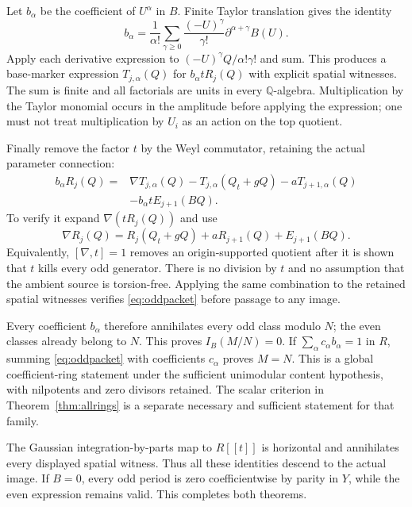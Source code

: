 \documentclass[11pt]{article}
\theoremstyle{definition}\newtheorem{definition}[theorem]{Definition}
\theoremstyle{remark}\newtheorem{remark}[theorem]{Remark}
\begin{document}
Let $b_\alpha$ be the coefficient of $U^\alpha$ in $B$.
Finite Taylor translation gives the identity
\begin{equation}\label{eq:coefficient}
 b_\alpha=\frac1{\alpha!}
    \sum_{\gamma\ge0}\frac{(-U)^\gamma}{\gamma!}
                         \partial^{\alpha+\gamma}B(U).
\end{equation}
Apply each derivative expression to $(-U)^\gamma Q/\alpha!\gamma!$
and sum. This produces a base-marker expression $T_{j,\alpha}(Q)$
for $b_\alpha tR_j(Q)$ with explicit spatial witnesses.
The sum is finite and all factorials are units in every
$\mathbb Q$-algebra. Multiplication by the Taylor monomial
occurs in the amplitude before applying the expression; one must
not treat multiplication by $U_i$ as an action on the top quotient.

Finally remove the factor $t$ by the Weyl commutator, retaining
the actual parameter connection:
\begin{equation}\label{eq:oddpacket}
\begin{split}
 b_\alpha R_j(Q)={}&\nabla T_{j,\alpha}(Q)
          -T_{j,\alpha}(Q_t+gQ)-aT_{j+1,\alpha}(Q)\\
          &-b_\alpha tE_{j+1}(BQ).
\end{split}
\end{equation}
To verify it expand $\nabla(tR_j(Q))$ and use
\[
 \nabla R_j(Q)=R_j(Q_t+gQ)+aR_{j+1}(Q)+E_{j+1}(BQ).
\]
Equivalently, $[\nabla,t]=1$ removes an origin-supported
quotient after it is shown that $t$ kills every odd generator.
There is no division by $t$ and no assumption that the ambient
source is torsion-free. Applying the same combination to the
retained spatial witnesses verifies \eqref{eq:oddpacket}
before passage to any image.

\begin{samepage}
Every coefficient $b_\alpha$ therefore annihilates every odd
class modulo $N$; the even classes already belong to $N$.
This proves $I_B(M/N)=0$. If
$\sum_\alpha c_\alpha b_\alpha=1$ in $R$, summing
\eqref{eq:oddpacket} with coefficients $c_\alpha$ proves $M=N$.
This is a global coefficient-ring statement under the sufficient
unimodular content hypothesis, with nilpotents and zero divisors retained.
The scalar criterion in Theorem~\ref{thm:allrings} is a separate
necessary and sufficient statement for that family.
\par\end{samepage}

The Gaussian integration-by-parts map to $R[[t]]$ is horizontal
and annihilates every displayed spatial witness. Thus all these
identities descend to the actual image. If $B=0$, every odd
period is zero coefficientwise by parity in $Y$, while the
even expression remains valid. This completes both theorems.
\end{document}
